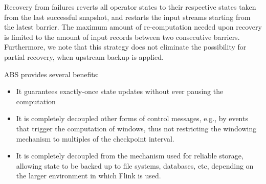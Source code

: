 Recovery from failures reverts all operator states to their respective states taken from the last successful snapshot, and restarts the input streams starting from the latest barrier. The maximum amount of re-computation needed upon recovery is limited to the amount of input records between two consecutive barriers. Furthermore,  we note that this strategy does not eliminate the possibility for partial recovery, when upstream backup is applied.



\vspace{1mm}
\noindent ABS provides several benefits:\vspace{-3mm}
\begin{itemize}
\item It guarantees exactly-once state updates without ever pausing the computation \vspace{-3mm}
\item It is completely decoupled other forms of control messages, e.g., by events that trigger the computation of windows, thus not restricting the windowing mechanism to multiples of the checkpoint interval. \vspace{-3mm}
\item It is completely decoupled from the mechanism used for reliable storage, allowing state to be backed up to file systems, databases, etc, depending on the larger environment in which Flink is used.
\end{itemize}



